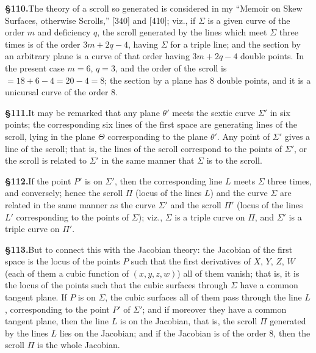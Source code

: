 \documentclass[11pt,a4paper]{article}
\begin{document}
\textbf{\S 110.}\quad The theory of a scroll so generated is considered in my ``Memoir on Skew Surfaces, otherwise Scrolls,'' [340] and [410]; viz., if $\Sigma$ is a given curve of the order $m$ and deficiency $q$, the scroll generated by the lines which meet $\Sigma$ three times is of the order $3m + 2q - 4$, having $\Sigma$ for a triple line; and the section by an arbitrary plane is a curve of that order having $3m + 2q - 4$ double points. In the present case $m = 6$, $q = 3$, and the order of the scroll is $= 18 + 6 - 4 = 20 - 4 = 8$; the section by a plane has 8 double points, and it is a unicursal curve of the order 8.

\textbf{\S 111.}\quad It may be remarked that any plane $\theta'$ meets the sextic curve $\Sigma'$ in six points; the corresponding six lines of the first space are generating lines of the scroll, lying in the plane $\Theta$ corresponding to the plane $\theta'$. Any point of $\Sigma'$ gives a line of the scroll; that is, the lines of the scroll correspond to the points of $\Sigma'$, or the scroll is related to $\Sigma'$ in the same manner that $\Sigma$ is to the scroll.

\textbf{\S 112.}\quad If the point $P'$ is on $\Sigma'$, then the corresponding line $L$ meets $\Sigma$ three times, and conversely; hence the scroll $\Pi$ (locus of the lines $L$) and the curve $\Sigma$ are related in the same manner as the curve $\Sigma'$ and the scroll $\Pi'$ (locus of the lines $L'$ corresponding to the points of $\Sigma$); viz., $\Sigma$ is a triple curve on $\Pi$, and $\Sigma'$ is a triple curve on $\Pi'$.

\textbf{\S 113.}\quad But to connect this with the Jacobian theory: the Jacobian of the first space is the locus of the points $P$ such that the first derivatives of $X$, $Y$, $Z$, $W$ (each of them a cubic function of $(x, y, z, w)$) all of them vanish; that is, it is the locus of the points such that the cubic surfaces through $\Sigma$ have a common tangent plane. If $P$ is on $\Sigma$, the cubic surfaces all of them pass through the line $L$, corresponding to the point $P'$ of $\Sigma'$; and if moreover they have a common tangent plane, then the line $L$ is on the Jacobian, that is, the scroll $\Pi$ generated by the lines $L$ lies on the Jacobian; and if the Jacobian is of the order 8, then the scroll $\Pi$ is the whole Jacobian.
\end{document}
